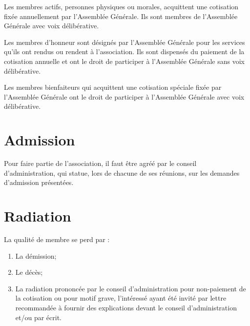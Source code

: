 \documentclass[12pt]{constitution}
\begin{document}
\medskip
Les membres actifs, personnes physiques ou morales, acquittent une cotisation fixée annuellement par l'Assemblée Générale. Ils sont membres de l'Assemblée Générale avec voix délibérative.

\medskip
Les membres d'honneur sont désignés par l'Assemblée Générale pour les services qu'ils ont rendus ou rendent à l'association. Ils sont dispensés du paiement de la cotisation annuelle et ont le droit de participer à l'Assemblée Générale sans voix délibérative.

\medskip
Les membres bienfaiteurs qui acquittent une cotisation spéciale fixée par l'Assemblée Générale ont le droit de participer à l'Assemblée Générale avec voix délibérative.

\section{Admission}
Pour faire partie de l'association, il faut être agréé par le conseil d’administration, qui statue, lors de chacune de ses réunions, sur les demandes d'admission présentées.

\section{Radiation}
La qualité de membre se perd par :
\begin{enumerate}
	\item La démission;
	\item Le décès;
	\item La radiation prononcée par le conseil d'administration pour non-paiement de la cotisation ou pour motif grave, l'intéressé ayant été invité par lettre recommandée à fournir des explications devant le conseil d'administration et/ou par écrit. 
\end{enumerate}
\end{document}
